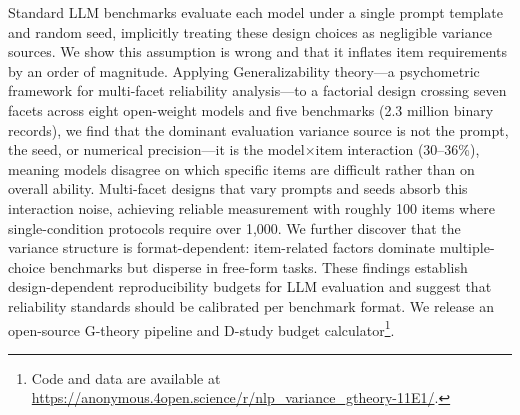 Standard LLM benchmarks evaluate each model under a single prompt template and random seed, implicitly treating these design choices as negligible variance sources. We show this assumption is wrong and that it inflates item requirements by an order of magnitude. Applying Generalizability theory---a psychometric framework for multi-facet reliability analysis---to a factorial design crossing seven facets across eight open-weight models and five benchmarks (2.3 million binary records), we find that the dominant evaluation variance source is not the prompt, the seed, or numerical precision---it is the model$\times$item interaction (30--36\%), meaning models disagree on which specific items are difficult rather than on overall ability. Multi-facet designs that vary prompts and seeds absorb this interaction noise, achieving reliable measurement with roughly 100 items where single-condition protocols require over 1,000. We further discover that the variance structure is format-dependent: item-related factors dominate multiple-choice benchmarks but disperse in free-form tasks. These findings establish design-dependent reproducibility budgets for LLM evaluation and suggest that reliability standards should be calibrated per benchmark format. We release an open-source G-theory pipeline and D-study budget calculator\footnote{Code and data are available at \url{https://anonymous.4open.science/r/nlp_variance_gtheory-11E1/}.}.

